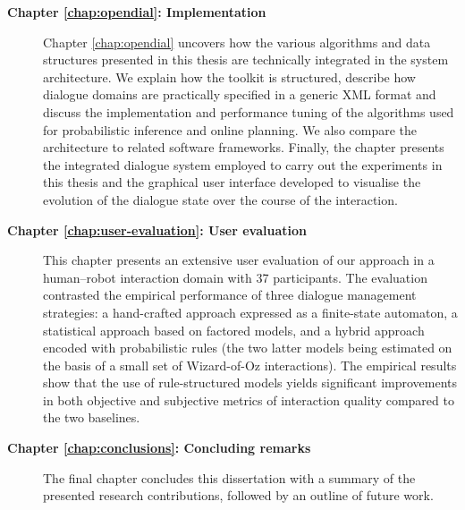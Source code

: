 \begin{description}
\item [\textbf{Chapter \ref{chap:opendial}: Implementation}] \hfill  \vspace{2mm}

Chapter \ref{chap:opendial} uncovers how the various algorithms and data structures presented in this thesis are technically integrated in the system architecture.  We explain how the \opendial{} toolkit is structured, describe how dialogue domains are practically specified in a generic XML format and discuss the implementation and performance tuning of the algorithms used for probabilistic inference and online planning.  We also compare the \opendial{} architecture to related software frameworks.  Finally, the chapter presents the integrated dialogue system employed to carry out the experiments in this thesis and the graphical user interface developed to visualise the evolution of the dialogue state over the course of the interaction. 

\item [\textbf{Chapter \ref{chap:user-evaluation}: User evaluation}] \hfill  \vspace{2mm}

This chapter presents an extensive user evaluation of our approach in a human--robot interaction domain with 37 participants.  The evaluation contrasted the empirical performance of three dialogue management strategies: a hand-crafted approach expressed as a finite-state automaton, a statistical approach based on factored models, and a hybrid approach encoded with probabilistic rules (the two latter models being estimated on the basis of a small set of Wizard-of-Oz interactions).  The empirical results show that the use of rule-structured models yields significant improvements in both objective and subjective metrics of interaction quality compared to the two baselines. \vspace{2mm}


\item [\textbf{Chapter \ref{chap:conclusions}: Concluding remarks}] \hfill  \vspace{2mm}

The final chapter concludes this dissertation with a summary of the presented research contributions, followed by an outline of future work.   \vspace{2mm}

\end{description}

